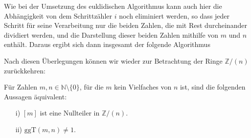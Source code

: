 \begin{notiz} Wie bei der Umsetzung des euklidischen Algorithmus kann auch hier die Abhängigkeit von 
dem Schrittzähler $i$  noch eliminiert werden, so dass jeder Schritt für seine Verarbeitung nur die beiden 
Zahlen, die mit Rest durcheinander dividiert werden, und die Darstellung dieser beiden Zahlen mithilfe 
von $m$ und $n$ enthält. Daraus ergibt sich dann insgesamt der folgende Algorithmus

\makebox[\textwidth]{\hrulefill}  

\makebox[\textwidth]{\hrulefill} 

\end{notiz}

\bigbreak

Nach diesen Überlegungen können wir wieder zur Betrachtung der Ringe $\mathbb Z/(n)$ zurückkehren:

\begin{satz}\label{gruppe_nullteiler_mod_n} 
Für Zahlen $m,n\in \mathbb N \setminus \{0 \}$, für die $m$ kein 
Vielfaches von $n$ ist, sind die folgenden Aussagen äquivalent:
\begin{itemize}
\item[i)] $[m]$ ist eine Nullteiler in $\mathbb Z/(n)$.
\item[ii)] $\textrm{ggT}(m,n) \neq 1$.
\end{itemize}
\end{satz}


\medbreak

